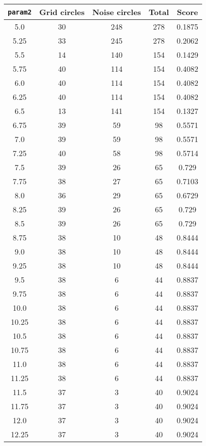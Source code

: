 \documentclass[letterpaper, 12pt]{article}
\begin{document}
\begin{longtable}{|c|c|c|c|c|}
\hline
\textbf{\texttt{param2}} & \textbf{Grid circles} & \textbf{Noise circles} & \textbf{Total} & \textbf{Score} \\
\hline
5.0 & 30 & 248 & 278 & 0.1875 \\
\hline
5.25 & 33 & 245 & 278 & 0.2062 \\
\hline
5.5 & 14 & 140 & 154 & 0.1429 \\
\hline
5.75 & 40 & 114 & 154 & 0.4082 \\
\hline
6.0 & 40 & 114 & 154 & 0.4082 \\
\hline
6.25 & 40 & 114 & 154 & 0.4082 \\
\hline
6.5 & 13 & 141 & 154 & 0.1327 \\
\hline
6.75 & 39 & 59 & 98 & 0.5571 \\
\hline
7.0 & 39 & 59 & 98 & 0.5571 \\
\hline
7.25 & 40 & 58 & 98 & 0.5714 \\
\hline
7.5 & 39 & 26 & 65 & 0.729 \\
\hline
7.75 & 38 & 27 & 65 & 0.7103 \\
\hline
8.0 & 36 & 29 & 65 & 0.6729 \\
\hline
8.25 & 39 & 26 & 65 & 0.729 \\
\hline
8.5 & 39 & 26 & 65 & 0.729 \\
\hline
8.75 & 38 & 10 & 48 & 0.8444 \\
\hline
9.0 & 38 & 10 & 48 & 0.8444 \\
\hline
9.25 & 38 & 10 & 48 & 0.8444 \\
\hline
9.5 & 38 & 6 & 44 & 0.8837 \\
\hline
9.75 & 38 & 6 & 44 & 0.8837 \\
\hline
10.0 & 38 & 6 & 44 & 0.8837 \\
\hline
10.25 & 38 & 6 & 44 & 0.8837 \\
\hline
10.5 & 38 & 6 & 44 & 0.8837 \\
\hline
10.75 & 38 & 6 & 44 & 0.8837 \\
\hline
11.0 & 38 & 6 & 44 & 0.8837 \\
\hline
11.25 & 38 & 6 & 44 & 0.8837 \\
\hline
11.5 & 37 & 3 & 40 & 0.9024 \\
\hline
11.75 & 37 & 3 & 40 & 0.9024 \\
\hline
12.0 & 37 & 3 & 40 & 0.9024 \\
\hline
12.25 & 37 & 3 & 40 & 0.9024 \\
\hline

\end{longtable}
\end{document}
